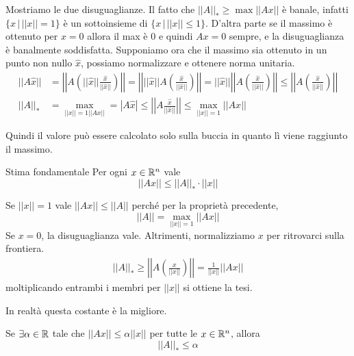 \documentclass[a4paper]{article}
\begin{document}
\begin{snippetproof}{}
    Mostriamo le due disuguaglianze.
    Il fatto che \(||A||_* \geq \max ||Ax||\) è banale, infatti \(\{x \,|\, ||x||=1\}\)
    è un sottoinsieme di \(\{x \,|\, ||x|| \leq 1\}\).
    D'altra parte se il massimo è ottenuto per \(x = 0\) allora il max è 0 e quindi
    \(Ax = 0\) sempre, e la disuguaglianza è banalmente soddisfatta.
    Supponiamo ora che il massimo sia ottenuto in un punto non nullo \(\hat{x}\),
    possiamo normalizzare e ottenere norma unitaria.
    \begin{align*}
        ||A\hat{x}|| &= \left|\left|A\left(||\hat{x}|| \frac{\hat{x}}{||\hat{x}||}\right)\right|\right|
        = \left|\left|||\hat{x}|| A \left(\frac{\hat{x}}{||\hat{x}||}\right)\right|\right|
        = ||\hat{x}|| \left|\left|A \left(\frac{\hat{x}}{||\hat{x}||}\right)\right|\right|
        \leq \left|\left|A\left(\frac{\hat{x}}{||\hat{x}||}\right)\right|\right| \\
        ||A||_* &= \max_{||x|| = 1 ||Ax||} = |A\hat{x}|
        \leq \left|\left|A\frac{\hat{x}}{||\hat{x}||}\right|\right| \leq \max_{||x||=1} ||Ax||
    \end{align*}
\end{snippetproof}

Quindi il valore può essere calcolato solo sulla buccia in quanto lì viene raggiunto il massimo.

\begin{snippetproposition}{Stima fondamentale}
    Per ogni \(x\in \mathbb{R}^n\) vale
    \[
        ||Ax|| \leq ||A||_* \cdot ||x||
    \]
\end{snippetproposition}

\begin{snippetproof}{}
    Se \(||x|| = 1\) vale \(||Ax|| \leq ||A||\)
    perché per la proprietà precedente, \[||A|| = \max_{||x||=1} ||Ax||\]
    Se \(x=0\), la disuguaglianza vale.
    Altrimenti, normalizziamo \(x\) per ritrovarci sulla frontiera.
    \begin{align*}
        ||A||_* \geq \left|\left|
        A\left(\frac{x}{||x||}\right)\right|\right|
        = \frac{1}{||x||} ||Ax||
    \end{align*}
    moltiplicando entrambi i membri per \(||x||\) si ottiene la tesi.
\end{snippetproof}

In realtà questa costante è la migliore.

\begin{snippetproposition}{}
    Se \(\exists \alpha \in \mathbb{R}\)
    tale che \(||Ax|| \leq \alpha ||x||\) per tutte le \(x \in \mathbb{R}^n\),
    allora \[||A||_* \leq \alpha\]
\end{snippetproposition}
\end{document}
